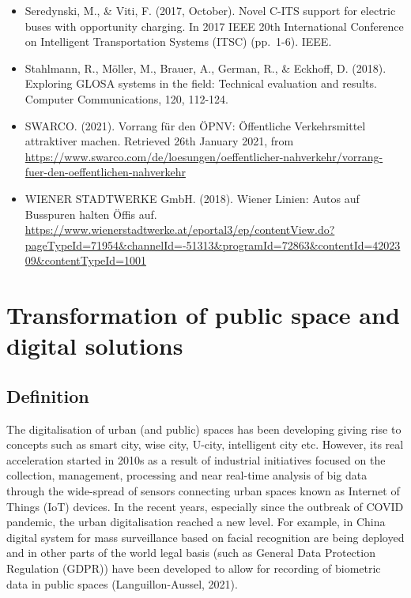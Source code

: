 \documentclass[
]{book}
\begin{document}
\begin{itemize}
\item
  Seredynski, M., \& Viti, F. (2017, October). Novel C-ITS support for electric buses with opportunity charging. In 2017 IEEE 20th International Conference on Intelligent Transportation Systems (ITSC) (pp.~1-6). IEEE.
\item
  Stahlmann, R., Möller, M., Brauer, A., German, R., \& Eckhoff, D. (2018). Exploring GLOSA systems in the field: Technical evaluation and results. Computer Communications, 120, 112-124.
\item
  SWARCO. (2021). Vorrang für den ÖPNV: Öffentliche Verkehrsmittel attraktiver machen. Retrieved 26th January 2021, from \url{https://www.swarco.com/de/loesungen/oeffentlicher-nahverkehr/vorrang-fuer-den-oeffentlichen-nahverkehr}
\item
  WIENER STADTWERKE GmbH. (2018). Wiener Linien: Autos auf Busspuren halten Öffis auf. \url{https://www.wienerstadtwerke.at/eportal3/ep/contentView.do?pageTypeId=71954\&channelId=-51313\&programId=72863\&contentId=4202309\&contentTypeId=1001}
\end{itemize}

\hypertarget{transformation_public_space}{%
\section{Transformation of public space and digital solutions}\label{transformation_public_space}}

\hypertarget{definition-3}{%
\subsection*{Definition}\label{definition-3}}

The digitalisation of urban (and public) spaces has been developing giving rise to concepts such as smart city, wise city, U-city, intelligent city etc. However, its real acceleration started in 2010s as a result of industrial initiatives focused on the collection, management, processing and near real-time analysis of big data through the wide-spread of sensors connecting urban spaces known as Internet of Things (IoT) devices. In the recent years, especially since the outbreak of COVID pandemic, the urban digitalisation reached a new level. For example, in China digital system for mass surveillance based on facial recognition are being deployed and in other parts of the world legal basis (such as General Data Protection Regulation (GDPR)) have been developed to allow for recording of biometric data in public spaces (Languillon-Aussel, 2021).
\end{document}
